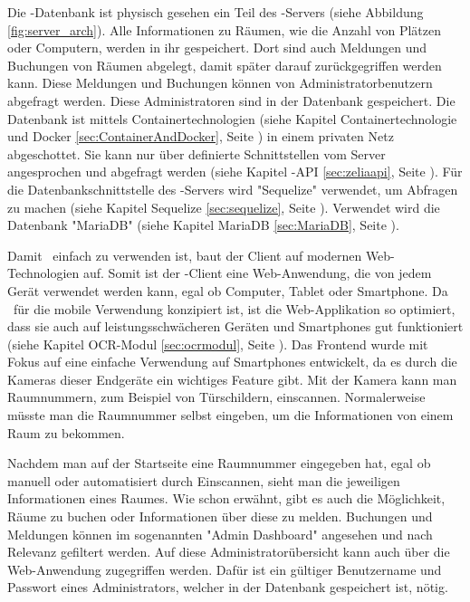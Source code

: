 Die \ZELIA-Datenbank ist physisch gesehen ein Teil des \ZELIA-Servers (siehe Abbildung \ref{fig:server_arch}). Alle Informationen zu Räumen, wie die Anzahl von Plätzen oder Computern, werden in ihr gespeichert. Dort sind auch Meldungen und Buchungen von Räumen abgelegt, damit später darauf zurückgegriffen werden kann. Diese Meldungen und Buchungen können von Administratorbenutzern abgefragt werden. Diese Administratoren sind in der Datenbank gespeichert. Die Datenbank ist mittels Containertechnologien (siehe Kapitel Containertechnologie und Docker \ref{sec:ContainerAndDocker}, Seite \pageref{sec:ContainerAndDocker}) in einem privaten Netz abgeschottet. Sie kann nur über definierte Schnittstellen vom Server angesprochen und abgefragt werden (siehe Kapitel \ZELIA-API \ref{sec:zeliaapi}, Seite \pageref{sec:zeliaapi}). Für die Datenbankschnittstelle des \ZELIA-Servers wird "Sequelize" verwendet, um Abfragen zu machen (siehe Kapitel Sequelize \ref{sec:sequelize}, Seite \pageref{sec:sequelize}). Verwendet wird die Datenbank "MariaDB" (siehe Kapitel MariaDB \ref{sec:MariaDB}, Seite \pageref{sec:sequelize}).



Damit \ZELIA\ einfach zu verwenden ist, baut der Client auf modernen Web-\-Techno\-logien auf. Somit ist der \ZELIA-Client eine Web-Anwendung,  die von jedem Gerät verwendet werden kann, egal ob Computer, Tablet oder Smartphone. Da \ZELIA\ für die mobile Verwendung konzipiert ist, ist die Web-Applikation so optimiert, dass sie auch auf leistungsschwächeren Geräten und Smartphones gut funktioniert (siehe Kapitel OCR-Modul \ref{sec:ocrmodul}, Seite \pageref{sec:ocrmodul}). Das Frontend wurde mit Fokus auf eine einfache Verwendung auf Smartphones entwickelt, da es durch die Kameras dieser Endgeräte ein wichtiges Feature gibt. Mit der Kamera kann man Raumnummern, zum Beispiel von Türschildern, einscannen. Normalerweise müsste man die Raumnummer selbst eingeben, um die Informationen von einem Raum zu bekommen. 

Nachdem man auf der Startseite eine Raumnummer eingegeben hat, egal ob manuell oder automatisiert durch Einscannen, sieht man die jeweiligen Informationen eines Raumes. Wie schon erwähnt, gibt es auch die Möglichkeit, Räume zu buchen oder Informationen über diese zu melden. Buchungen und Meldungen können im sogenannten "Admin Dashboard" angesehen und nach Relevanz gefiltert werden. Auf diese Administratorübersicht kann auch über die Web-Anwendung zugegriffen werden. Dafür ist ein gültiger Benutzername und Passwort eines Administrators, welcher in der Datenbank gespeichert ist, nötig.

